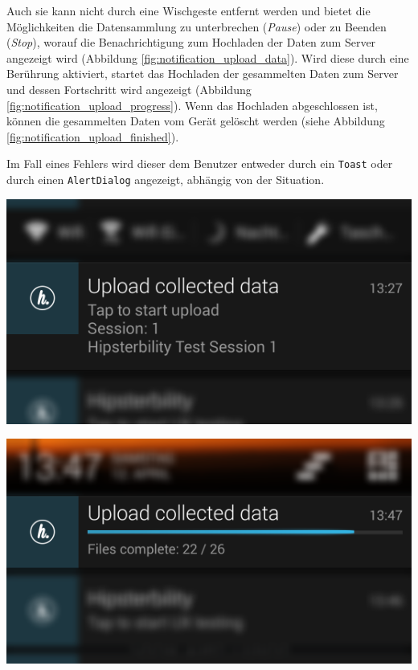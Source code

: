 Auch sie kann nicht durch eine Wischgeste entfernt werden und bietet die Möglichkeiten die Datensammlung zu unterbrechen (\emph{Pause}) oder zu Beenden (\emph{Stop}), worauf die Benachrichtigung zum Hochladen der Daten zum Server angezeigt wird (Abbildung \ref{fig:notification_upload_data}).
Wird diese durch eine Berührung aktiviert, startet das Hochladen der gesammelten Daten zum Server und dessen Fortschritt wird angezeigt (Abbildung \ref{fig:notification_upload_progress}).
Wenn das Hochladen abgeschlossen ist, können die gesammelten Daten vom Gerät gelöscht werden (siehe Abbildung \ref{fig:notification_upload_finished}).

Im Fall eines Fehlers wird dieser dem Benutzer entweder durch ein \texttt{Toast} oder durch einen \texttt{AlertDialog} angezeigt, abhängig von der Situation.

\begin{minipage}[t]{0.45\linewidth}
	\centering
	\includegraphics[width=\linewidth]{img/notification_upload_data}
	 \label{fig:notification_upload_data}
\end{minipage}
\hfill
\begin{minipage}[t]{0.45\linewidth}
	\centering
	\includegraphics[width=\linewidth]{img/notification_upload_progress}
	 \label{fig:notification_upload_progress}
\end{minipage}

